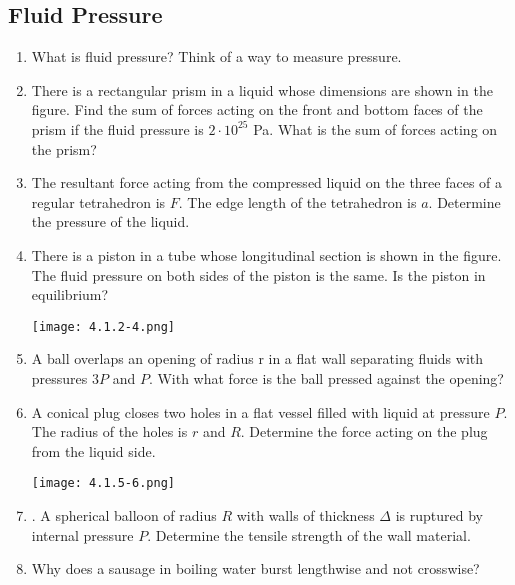 \documentclass{article}
\begin{document}
\subsection{Fluid Pressure}

\begin{enumerate}[label=4.1.\arabic*]

\item What is fluid pressure? Think of a way to measure pressure.

\item There is a rectangular prism in a liquid whose dimensions are shown in the figure. Find the sum of forces acting on the front and bottom faces of the prism if the fluid pressure is $2 \cdot 10^{25}$ Pa. What is the sum of forces acting on the prism? 

\item The resultant force acting from the compressed liquid on the three faces of a regular tetrahedron is $F$. The edge length of the tetrahedron is $a$. Determine the pressure of the liquid.    

\item There is a piston in a tube whose longitudinal section is shown in the figure. The fluid pressure on both sides of the piston is the same. Is the piston in equilibrium?

\begin{center}
    \texttt{[image: 4.1.2-4.png]}
\end{center}

\item A ball overlaps an opening of radius r in a flat wall separating fluids with pressures $3P$ and $P$. With what force is the ball pressed against the opening? 

\item A conical plug closes two holes in a flat vessel filled with liquid at pressure $P$. The radius of the holes is $r$ and $R$. Determine the force acting on the plug from the liquid side.   
\begin{center}
    \texttt{[image: 4.1.5-6.png]}
\end{center}

\item . A spherical balloon of radius $R$ with walls of thickness $\Delta$ is ruptured by internal pressure $P$. Determine the tensile strength of the wall material. 




\item Why does a sausage in boiling water burst lengthwise and not crosswise?    


\end{enumerate}
\end{document}
